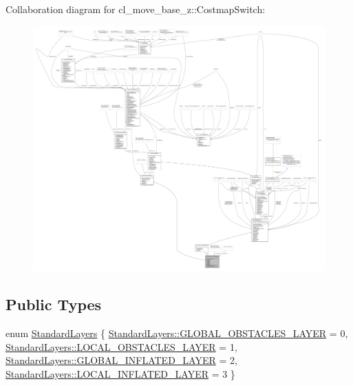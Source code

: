 Collaboration diagram for cl\+\_\+move\+\_\+base\+\_\+z\+:\+:Costmap\+Switch\+:
\nopagebreak
\begin{figure}[H]
\begin{center}
\leavevmode
\includegraphics[width=350pt]{classcl__move__base__z_1_1CostmapSwitch__coll__graph}
\end{center}
\end{figure}
\subsection*{Public Types}
\begin{DoxyCompactItemize}
\item 
enum \hyperlink{classcl__move__base__z_1_1CostmapSwitch_af38aeee5e3893e689cd74ddddfe0df15}{Standard\+Layers} \{ \hyperlink{classcl__move__base__z_1_1CostmapSwitch_af38aeee5e3893e689cd74ddddfe0df15a94404229e09ab748aab0096bd5ff3656}{Standard\+Layers\+::\+G\+L\+O\+B\+A\+L\+\_\+\+O\+B\+S\+T\+A\+C\+L\+E\+S\+\_\+\+L\+A\+Y\+ER} = 0, 
\hyperlink{classcl__move__base__z_1_1CostmapSwitch_af38aeee5e3893e689cd74ddddfe0df15aff8d30cf6ceac8551691e28c328aebe6}{Standard\+Layers\+::\+L\+O\+C\+A\+L\+\_\+\+O\+B\+S\+T\+A\+C\+L\+E\+S\+\_\+\+L\+A\+Y\+ER} = 1, 
\hyperlink{classcl__move__base__z_1_1CostmapSwitch_af38aeee5e3893e689cd74ddddfe0df15a1757575ee674622adfb325de182a65d6}{Standard\+Layers\+::\+G\+L\+O\+B\+A\+L\+\_\+\+I\+N\+F\+L\+A\+T\+E\+D\+\_\+\+L\+A\+Y\+ER} = 2, 
\hyperlink{classcl__move__base__z_1_1CostmapSwitch_af38aeee5e3893e689cd74ddddfe0df15aab9e94e9dc4c62e74e48ee34b11c8807}{Standard\+Layers\+::\+L\+O\+C\+A\+L\+\_\+\+I\+N\+F\+L\+A\+T\+E\+D\+\_\+\+L\+A\+Y\+ER} = 3
 \}
\end{DoxyCompactItemize}
